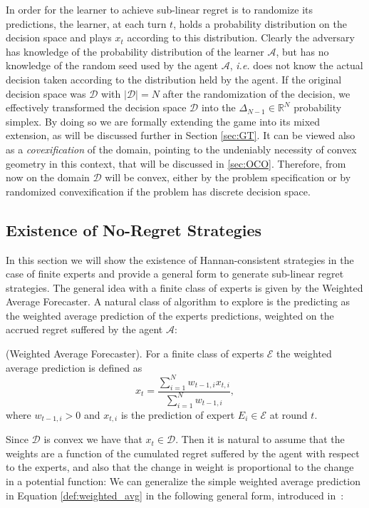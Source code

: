 In order for the learner to achieve sub-linear regret is to randomize its predictions, the learner, at each turn $t$, holds a probability distribution on the decision space and plays $x_t$ according to this distribution. Clearly the adversary has knowledge of the probability distribution of the learner $\mathcal A$, but has no knowledge of the random seed used by the agent $\mathcal A$, \emph{i.e.} does not know the actual decision taken according to the distribution held by the agent. If the original decision space was $\mathcal D$ with $|\mathcal D|=N$ after the randomization of the decision, we effectively transformed the decision space $\mathcal D$ into the $\Delta_{N-1}\in\mathbb R^{N}$ probability simplex. By doing so we are formally extending the game into its mixed extension, as will be discussed further in Section \ref{sec:GT}. It can be viewed also as a \emph{covexification} of the domain, pointing to the undeniably necessity of convex geometry in this context, that will be discussed in \ref{sec:OCO}. Therefore, from now on the domain $\mathcal D$ will be convex, either by the problem specification or by randomized convexification if the problem has discrete decision space.

\subsection{Existence of No-Regret Strategies}
In this section we will show the existence of Hannan-consistent strategies in the case of finite experts and provide a general form to generate sub-linear regret strategies. 
The general idea with a finite class of experts is given by the Weighted Average Forecaster. A natural class of algorithm to explore is the predicting as the weighted average prediction of the experts predictions, weighted on the accrued regret suffered by the agent $\mathcal A$:

\begin{definition}(Weighted Average Forecaster).\label{def:weighted_avg}
For a finite class of experts $\mathcal E$ the weighted average prediction is defined as
\begin{equation}
	x_t = \frac{\sum\limits_{i=1}^{N}w_{t-1,i}x_{t,i}}{\sum\limits_{i=1}^{N}w_{t-1,i}},
\end{equation}
where $w_{t-1,i}>0$ and $x_{t,i}$ is the prediction of expert $E_i\in\mathcal E$ at round $t$. 
\end{definition}

Since $\mathcal D$ is convex we have that $x_t\in\mathcal D$.
Then it is natural to assume that the weights are a function of the cumulated regret suffered by the agent with respect to the experts, and also that the change in weight is proportional to the change in a potential function:
We can generalize the simple weighted average prediction in Equation \eqref{def:weighted_avg} in the following general form, introduced in~\cite{cesa2003potential}:

